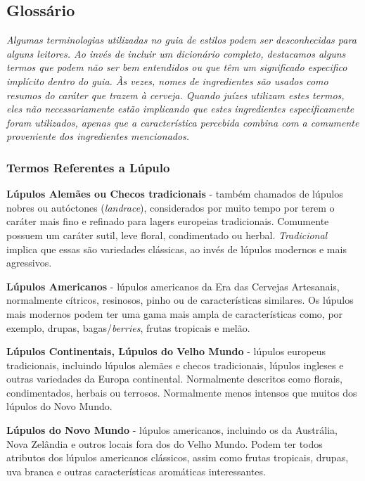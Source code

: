 \subsection*{Glossário}
\textit{Algumas terminologias utilizadas no guia de estilos podem ser desconhecidas para alguns leitores. Ao invés de incluir um dicionário completo, destacamos alguns termos que podem não ser bem entendidos ou que têm um significado especifico implícito dentro do guia. Às vezes, nomes de ingredientes são usados como resumos do caráter que trazem à cerveja. Quando juízes utilizam estes termos, eles não necessariamente estão implicando que estes ingredientes especificamente foram utilizados, apenas que a característica percebida combina com a comumente proveniente dos ingredientes mencionados.}
\subsubsection*{Termos Referentes a Lúpulo}
\textbf{Lúpulos Alemães ou Checos tradicionais} - também chamados de lúpulos nobres ou autóctones (\textit{landrace}), considerados por muito tempo por terem o caráter mais fino e refinado para lagers europeias tradicionais. Comumente possuem um caráter sutil, leve floral, condimentado ou herbal. \textit{Tradicional} implica que essas são variedades clássicas, ao invés de lúpulos modernos e mais agressivos.

\textbf{Lúpulos Americanos} - lúpulos americanos da Era das Cervejas Artesanais, normalmente cítricos, resinosos, pinho ou de características similares. Os lúpulos mais modernos podem ter uma gama mais ampla de características como, por exemplo, drupas, bagas/\textit{berries}, frutas tropicais e melão.

\textbf{Lúpulos Continentais, Lúpulos do Velho Mundo} - lúpulos europeus tradicionais, incluindo lúpulos alemães e checos tradicionais, lúpulos ingleses e outras variedades da Europa continental. Normalmente descritos como florais, condimentados, herbais ou terrosos. Normalmente menos intensos que muitos dos lúpulos do Novo Mundo.

\textbf{Lúpulos do Novo Mundo} - lúpulos americanos, incluindo os da Austrália, Nova Zelândia e outros locais fora dos do Velho Mundo. Podem ter todos atributos dos lúpulos americanos clássicos, assim como frutas tropicais, drupas, uva branca e outras características aromáticas interessantes.


